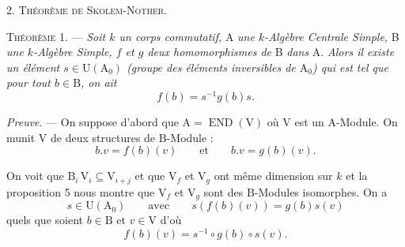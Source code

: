 2. \textsc{Théorème de Skolem-Nother}.

\textsc{Théorème 1}. — \emph{Soit $k$ un corps commutatif,} A \emph{une $k$-Algèbre Centrale Simple,} B \emph{une
$k$-Algèbre Simple, $f$ et $g$ deux homomorphismes de} B \emph{dans} A. \emph{Alors il existe un élément
$s\in\mathrm U(\mathrm A_0)$ (groupe des éléments inversibles de $\mathrm A_0$) qui est tel que pour tout $b\in\mathrm B$, on ait}
\[
f(b)=s^{-1}g(b)s.
\]

\emph{Preuve}. — On suppose d'abord que $\mathrm A=\operatorname{END}(\mathrm V)$ où V est un A-Module. On munit V
de deux structures de B-Module :
\[
b.v=f(b)(v)\qquad\text{et}\qquad b.v=g(b)(v).
\]

On voit que $\mathrm B_i\,\mathrm V_i\subseteq\mathrm V_{i+j}$ et que $\mathrm V_f$ et $\mathrm V_g$ ont même dimension sur $k$ et la proposition 5
nous montre que $\mathrm V_f$ et $\mathrm V_g$ sont des B-Modules isomorphes. On a
\[
s\in\mathrm U(\mathrm A_0)\qquad\text{avec}\qquad s(f(b)(v))=g(b)s(v)
\]
quels que soient $b\in\mathrm B$ et $v\in\mathrm V$ d'où
\[
f(b)(v)=s^{-1}\circ g(b)\circ s(v).
\]

